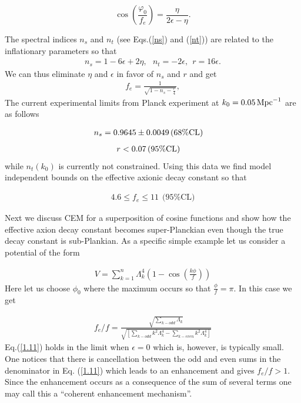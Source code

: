\documentclass[12pt]{article}
\begin{document}
\begin{equation}\label{DisplayFormulaNumbered:eq.fieldInitial.slowRoll}
  \cos\left(\frac{\varphi_0}{f_e}\right)=\frac{\eta}{2\epsilon-\eta}.
\end{equation}

The spectral indices $n_s$ and $n_t$ (see Eqs.(\ref{ns}) and (\ref{nt}))
are related to the inflationary parameters so that
\begin{align}
  n_s= 1-6\epsilon + 2 \eta, ~~~n_t = -2 \epsilon, ~~ r = 16 \epsilon.
  \label{ns-nt-r}
\end{align}
We can thus eliminate $\eta$ and $\epsilon$ in favor of $n_s$ and $r$ and get
\begin{align}
  f_e=\frac{1}{\sqrt{1-n_s- \frac{r}{4}}},
\end{align}
The current experimental limits from Planck experiment at $k_0=0.05\, {\rm Mpc}^{-1}$ are as follows
~\cite{Adam:2015rua,Ade:2015lrj,Array:2015xqh}

\begin{align}
  n_s & = 0.9645 \pm 0.0049\, (68\% {\rm CL})
\end{align}
\begin{align}
  r & <0.07\, (95\% {\rm CL})
  \label{data}
\end{align}
while $n_t(k_0)$ is currently not constrained. Using this data we find model independent bounds on the effective axionic decay constant
so that

\begin{align}
  4.6 \leq f_e \leq 11 ~~(95\% \text{CL)}
\end{align}

Next we discuss CEM for a superposition of cosine functions and show how the effective axion decay constant becomes super-Planckian
even though the true decay constant is sub-Plankian.
As a specific simple example let us consider a potential of the form

\begin{align}
  V = \sum_{k=1}^n\Lambda_k^4 \left(1-\cos(\frac{k\phi}{ f})\right)
  \label{1.1}
\end{align}
Here let us choose $\phi_0$ where the maximum occurs so that $\frac{\phi}{ f}= \pi$. In this case we get

\begin{align}
  {f_e}/f = \frac{\sqrt{ \sum_{k-odd}\Lambda_k}
  }{ \sqrt{\left[ \sum_{k-odd} k^2\Lambda_k^4 - \sum_{k-even} k^2\Lambda_k^4\right]}}
  \label{1.11}
\end{align}
Eq.(\ref{1.11}) holds in the limit when $\epsilon=0$ which is, however, is typically small.
One notices that there is cancellation between the odd and even sums in the denominator in Eq. (\ref{1.11}) which
leads to an enhancement and gives $f_e/f >1$. Since the enhancement occurs as a consequence of the sum of several terms one
may call this a ``coherent enhancement mechanism''.
\end{document}
